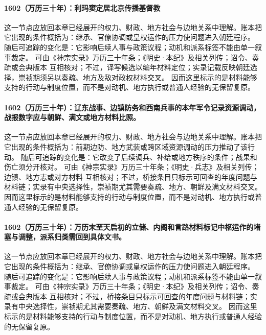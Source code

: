 \paragraph{1602（万历三十年）：利玛窦定居北京传播基督教} 这一节点应放回本章已经展开的权力、财政、地方社会与边地关系中理解。账本把它出现的条件概括为：继承、官僚协调或皇权运作的压力使问题进入朝廷程序。 随后可追踪的变化是：它影响后续人事与政策议程；动机和派系标签不能由单一叙事裁定。 可由《神宗实录》万历三十年条；《明史·本纪》及相关列传；诏令、奏疏或会典版本 互相核对；不过，译写候选以编年材料定位；实录记载反映朝廷选择，崇祯期须另以奏疏、地方及敌对政权材料交叉。 因而这里标示的是材料能够支持的行动与制度位置，而不是对动机、地方执行或普通人经验的无保留复原。

\paragraph{1602（万历三十年）：辽东战事、边镇防务和西南兵事的本年军令记录资源调动，战报数字应与朝鲜、满文或地方材料比照。} 这一节点应放回本章已经展开的权力、财政、地方社会与边地关系中理解。账本把它出现的条件概括为：前期边防、地方武装或跨区域资源调动的压力推动了该行动。 随后可追踪的变化是：它改变了后续调兵、补给或地方秩序的条件；战果和伤亡须分开核对。 可由《神宗实录》万历三十年条；《明史·兵志》及相关列传；边镇、地方志或对方材料 互相核对；不过，桥接条目只标示可回查的年度问题与材料链；实录有中央选择性，崇祯期尤其需要奏疏、地方、朝鲜及满文材料交叉。 因而这里标示的是材料能够支持的行动与制度位置，而不是对动机、地方执行或普通人经验的无保留复原。

\paragraph{1602（万历三十年）：万历末至天启初的立储、内阁和言路材料标记中枢运作的堵塞与调整，派系归类需回到具体文书。} 这一节点应放回本章已经展开的权力、财政、地方社会与边地关系中理解。账本把它出现的条件概括为：继承、官僚协调或皇权运作的压力使问题进入朝廷程序。 随后可追踪的变化是：它影响后续人事与政策议程；动机和派系标签不能由单一叙事裁定。 可由《神宗实录》万历三十年条；《明史·本纪》及相关列传；诏令、奏疏或会典版本 互相核对；不过，桥接条目只标示可回查的年度问题与材料链；实录有中央选择性，崇祯期尤其需要奏疏、地方、朝鲜及满文材料交叉。 因而这里标示的是材料能够支持的行动与制度位置，而不是对动机、地方执行或普通人经验的无保留复原。

